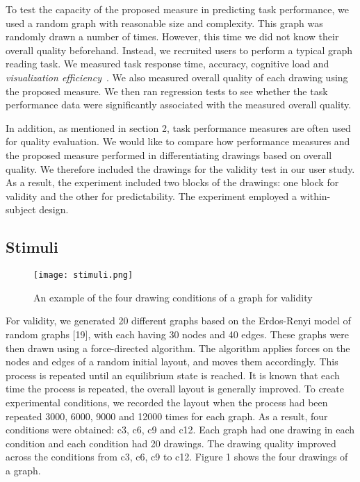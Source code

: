 \documentclass[conference,letterpaper]{IEEEtran}
\begin{document}
To test the capacity of the proposed measure in predicting task performance, we used a random graph with reasonable size and complexity. This graph was randomly drawn a number of times. However, this time we did not know their overall quality beforehand. Instead, we recruited users to perform a typical graph reading task. We measured task response time, accuracy, cognitive load and \emph{visualization efficiency}~\cite{huang09}. We also measured overall quality of each drawing using the proposed measure. We then ran regression tests to see whether the task performance data were significantly associated with the measured overall quality.


In addition, as mentioned in section 2, task performance measures are often used for quality evaluation. We would like to compare how performance measures and the proposed measure performed in differentiating drawings based on overall quality. We therefore included the drawings for the validity test in our user study. As a result, the experiment included two blocks of the drawings: one block for validity and the other for predictability. The experiment employed a within-subject design.
 
\subsection{Stimuli}

\begin{figure*}[t]
\centering
\texttt{[image: stimuli.png]}
\caption{An example of the four drawing conditions of a graph for validity} \label{fig:stimuli1}
\end{figure*}

For validity, we generated 20 different graphs based on the Erdos-Renyi model of random graphs [19], with each having 30 nodes and 40 edges. These graphs were then drawn using a force-directed algorithm. The algorithm applies forces on the nodes and edges of a random initial layout, and moves them accordingly. This process is repeated until an equilibrium state is reached. It is known that each time the process is repeated, the overall layout is generally improved. To create experimental conditions, we recorded the layout when the process had been repeated 3000, 6000, 9000 and 12000 times for each graph. As a result, four conditions were obtained: c3, c6, c9 and c12. Each graph had one drawing in each condition and each condition had 20 drawings. The drawing quality improved across the conditions from c3, c6, c9 to c12. Figure 1 shows the four drawings of a graph.
\end{document}

